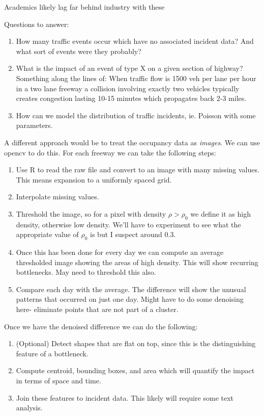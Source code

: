 \documentclass[12pt]{article}
\begin{document}
Academics likely lag far behind industry with these

Questions to answer:
\begin{enumerate}
    \item How many traffic events occur which have no associated incident
        data? And what sort of events were they probably?
    \item What is the impact of an event of type X on a given section of
        highway? Something along the lines of: When traffic flow is 1500
        veh per lane per hour in a two lane freeway a collision involving
        exactly two vehicles typically creates congestion lasting 10-15
        minutes which propagates back 2-3 miles. 
    \item How can we model the distribution of traffic incidents, ie.
        Poisson with some parameters.
\end{enumerate}



A different approach would be to treat the occupancy data as \emph{images}.
We can use opencv to do this. For each freeway we can take the following
steps:
\begin{enumerate}
    \item Use R to read the raw file and convert to an image with many missing
        values. This means expansion to a uniformly spaced grid.
    \item Interpolate missing values. 
    \item Threshold the image, so for a pixel with density $\rho >
        \rho_0$
        we define it as high density, otherwise low density. We'll
        have to experiment to see what the appropriate value of $\rho_0$ is
        but I suspect around 0.3.
    \item Once this has been done for every day we can compute an average
        thresholded image showing the areas of high density. This will show
        recurring bottlenecks. May need to threshold this also.
    \item Compare each day with the average. The difference will show the
        unusual patterns that occurred on just one day. Might have to do
        some denoising here- eliminate points that are not part of a 
        cluster.
\end{enumerate}

Once we have the denoised difference we can do the following:
\begin{enumerate}
    \item (Optional) Detect shapes that are flat on top, since this is the
        distinguishing feature of a bottleneck.
    \item Compute centroid, bounding boxes, and area which will quantify the impact
        in terms of space and time.
    \item Join these features to incident data. This likely will require some text
        analysis.
\end{enumerate}
\end{document}
